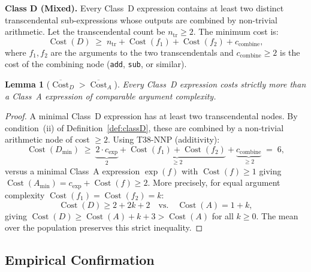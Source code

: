 \documentclass[12pt,a4paper]{article}
\newtheorem{lemma}[theorem]{Lemma}
\theoremstyle{definition}
\newcommand{\Cost}{\operatorname{Cost}}
\newcommand{\cexp}{c_{\mathrm{exp}}}
\begin{document}
\medskip
\noindent\textbf{Class D (Mixed).}
Every Class~D expression contains at least two distinct transcendental
sub-expressions whose outputs are combined by non-trivial arithmetic.
Let the transcendental count be $n_{\mathrm{tr}} \geq 2$.
The minimum cost is:
\[
  \Cost(D) \;\geq\; n_{\mathrm{tr}} + \Cost(f_1) + \Cost(f_2) + c_{\mathrm{combine}},
\]
where $f_1, f_2$ are the arguments to the two transcendentals and
$c_{\mathrm{combine}} \geq 2$ is the cost of the combining node
(\texttt{add}, \texttt{sub}, or similar).

\begin{lemma}[$\overline{\Cost}_D > \overline{\Cost}_A$]
\label{lem:DgtA}
Every Class~D expression costs strictly more than a Class~A expression of
comparable argument complexity.
\end{lemma}

\begin{proof}
A minimal Class~D expression has at least two transcendental nodes.
By condition~(ii) of Definition~\ref{def:classD}, these are combined by
a non-trivial arithmetic node of cost $\geq 2$.
Using T38-NNP (additivity):
\[
  \Cost(D_{\min}) \;\geq\;
    \underbrace{2 \cdot \cexp}_{2}
  + \underbrace{\Cost(f_1) + \Cost(f_2)}_{\geq 2}
  + \underbrace{c_{\mathrm{combine}}}_{\geq 2}
  \;=\; 6,
\]
versus a minimal Class~A expression $\exp(f)$ with $\Cost(f) \geq 1$
giving $\Cost(A_{\min}) = \cexp + \Cost(f) \geq 2$.
More precisely, for equal argument complexity $\Cost(f_1) = \Cost(f_2) = k$:
\[
  \Cost(D) \geq 2 + 2k + 2
  \quad\text{vs.}\quad
  \Cost(A) = 1 + k,
\]
giving $\Cost(D) \geq \Cost(A) + k + 3 > \Cost(A)$ for all $k \geq 0$.
The mean over the population preserves this strict inequality.
\end{proof}

\subsection{Empirical Confirmation}
\end{document}

